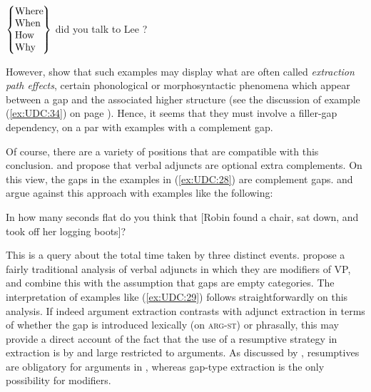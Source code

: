 \documentclass[output=paper
,notxmath 
 	        ,biblatex
                ,babelshorthands
                ,newtxmath
                ,draftmode
                ,colorlinks, citecolor=brown
]{langscibook}
\begin{document}
\ea
\label{ex:UDC:28}
$\begin{array}{@{}l@{}}
\left\{%
\begin{tabular}{@{}l@{}}
  Where\hspace{-.09em}\mbox{}\\
  When\\
  How\\
  Why\\
\end{tabular}\right\}
\end{array}$
did you talk to Lee \trace{}?
\z

\noindent
However, \cite{hukari.levine:adjunct} show that such examples may display
what are often called \emph{extraction path effects}, certain phonological or
morphosyntactic phenomena which appear between a gap and the associated
higher structure (see the discussion of example (\ref{ex:UDC:34}) on
page \pageref{ex:UDC:34}). Hence, it seems that they must
involve a filler-gap dependency, on a par with examples with a
complement gap.

Of course, there are a variety of positions that are compatible with
this conclusion. \citet[]{Bouma:Malouf:Sag:01} and \citet[168,
fn.~2]{Ginzburg:Sag:01} propose that verbal adjuncts are optional
extra complements.  On this view, the gaps in the examples in
(\ref{ex:UDC:28}) are complement gaps.  \citet{Levine:03} and
\citet[Chapter~3.5--3.6]{Levine:Hukari:06} argue against this approach with examples
like the following:

\begin{exe}
\ex \label{ex:UDC:29}
In how many seconds flat do you think that [Robin found a chair,
sat down, and took off her logging boots]?
\end{exe}

\noindent
This is a query about the total time taken by three distinct events.
\citeauthor{Levine:Hukari:06} propose a fairly traditional analysis of verbal
adjuncts in which they are modifiers of VP, and combine this with the
assumption that gaps are empty categories. The interpretation of
examples like (\ref{ex:UDC:29}) follows straightforwardly on this
analysis. If indeed argument extraction contrasts with adjunct
extraction in terms of whether the gap is introduced  lexically (on
\textsc{arg-st}) or phrasally, this may
provide a direct account of the fact that the use of a resumptive
strategy in extraction is by and large restricted to arguments. As
discussed by \citet{Crysmann:Reintges:14}, resumptives are obligatory
for arguments in , whereas gap-type extraction is the only
possibility for modifiers.
 
\end{document}
